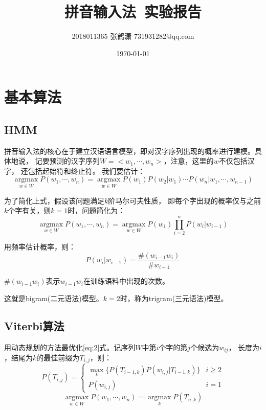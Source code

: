 \documentclass[12pt, UTF8, a4paper]{ctexart}
\title{拼音输入法\ 实验报告}
\author{2018011365 张鹤潇 731931282@qq.com}
\date{\today}
\begin{document}
\begin{titlepage}
    
\maketitle

%    

\tableofcontents

\thispagestyle{empty}
\end{titlepage}

\setcounter{page}{1}
\section{基本算法}

\subsection{HMM}

拼音输入法的核心在于建立汉语语言模型，即对汉字序列出现的概率进行建模。具体地说，
记要预测的汉字序列$W=<w_1,\cdots,w_n>$，注意，这里的$w$不仅包括汉字，
还包括起始符和终止符。 我们要估计：
\begin{equation}\label{eq:1}
\mathop{argmax}\limits_{w\in W} P(w_1,\cdots,w_n)=
\mathop{argmax}\limits_{w\in W} P(w_1)P(w_2|w_1)\cdots 
P(w_n|w_1,\cdots, w_{n-1})
\end{equation}

为了简化上式，假设该问题满足$k$阶马尔可夫性质，
即每个字出现的概率仅与之前$k$个字有关，则$k=1$时，问题简化为：
\begin{equation}\label{eq:2}
\mathop{argmax}\limits_{w\in W} P(w_1,\cdots,w_n)=
\mathop{argmax}\limits_{w\in W} P(w_1)
\prod_{i=2}^n P(w_i|w_{i-1})
\end{equation}

用频率估计概率，则：
$$
P(w_i|w_{i-1})=\frac{\#(w_{i-1}w_i)}{\#w_{i-1}}
$$

$\#(w_{i-1}w_{i})$表示$w_{i-1}w_i$在训练语料中出现的次数。

这就是bigram(二元语法)模型。$k=2$时，称为trigram(三元语法)模型。

\subsection{Viterbi算法}

用动态规划的方法最优化\ref{eq:2}式。记序列$W$中第$i$个字的第$j$个候选为$w_{ij}$，
长度为$i$，结尾为$k$的最佳前缀为$T_{i,j}$，则：
\begin{equation}\label{eq:3}
P(T_{i,j}) = \begin{cases}
\max\limits_{k} \{P(T_{i-1,k})P(w_{i,j}|T_{i-1,k})\} &i\ge 2\\
P(w_{i,j})& i=1
\end{cases}
\end{equation}
$$
\mathop{argmax}\limits_{w\in W} P(w_1,\cdots,w_n)
=\mathop{argmax}\limits_{k} P(T_{n,k})
$$
\end{document}
